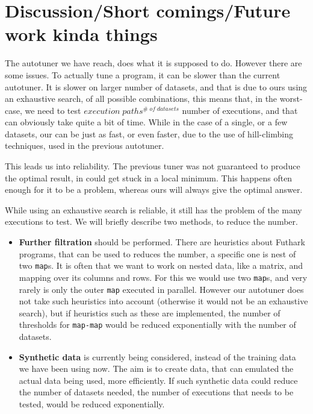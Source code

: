 \section{Discussion/Short comings/Future work kinda things}
The autotuner we have reach, does what it is supposed to do. However there are some issues. To actually tune a program, it can be slower than the current autotuner. It is slower on larger number of datasets, and that is due to ours using an exhaustive search, of all possible combinations, this means that, in the worst-case, we need to test $execution \; paths^{\# \; of \; datasets}$ number of executions, and that can obviously take quite a bit of time. While in the case of a single, or a few datasets, our can be just as fast, or even faster, due to the use of hill-climbing techniques, used in the previous autotuner. 

This leads us into reliability. The previous tuner was not guaranteed to produce the optimal result, in could get stuck in a local minimum. This happens often enough for it to be a problem, whereas ours will always give the optimal answer. 

While using an exhaustive search is reliable, it still has the problem of the many executions to test. We will briefly describe two methods, to reduce the number.
\begin{itemize}
	\item \textbf{Further filtration} should be performed. There are heuristics about Futhark programs, that can be used to reduces the number, a specific one is nest of two \texttt{map}s. It is often that we want to work on nested data, like a matrix, and mapping over its columns and rows. For this we would use two \texttt{map}s, and very rarely is only the outer \texttt{map} executed in parallel. However our autotuner does not take such heuristics into account (otherwise it would not be an exhaustive search), but if heuristics such as these are implemented, the number of thresholds for \texttt{map-map} would be reduced exponentially with the number of datasets.
	\item \textbf{Synthetic data} is currently being considered, instead of the training data we have been using now. The aim is to create data, that can emulated the actual data being used, more efficiently. If such synthetic data could reduce the number of datasets needed, the number of executions that needs to be tested, would be reduced exponentially.	
\end{itemize}

